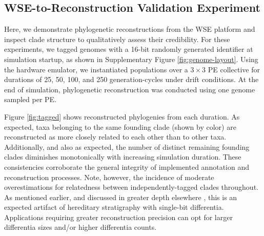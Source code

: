 \subsection{WSE-to-Reconstruction Validation Experiment}


Here, we demonstrate phylogenetic reconstructions from the WSE platform and inspect clade structure to qualitatively assess their credibility.
For these experiments, we tagged genomes with a 16-bit randomly generated identifier at simulation startup, as shown in Supplementary Figure \ref{fig:genome-layout}.
Using the hardware emulator, we instantiated populations over a $3\times3$ PE collective for durations of 25, 50, 100, and 250 generation-cycles under drift conditions.
At the end of simulation, phylogenetic reconstruction was conducted using one genome sampled per PE.



Figure \ref{fig:tagged} shows reconstructed phylogenies from each duration.
As expected, taxa belonging to the same founding clade (shown by color) are reconstructed as more closely related to each other than to other taxa.
Additionally, and also as expected, the number of distinct remaining founding clades diminishes monotonically with increasing simulation duration.
These consistencies corroborate the general integrity of implemented annotation and reconstruction processes.
Note, however, the incidence of moderate overestimations for relatedness between independently-tagged clades throughout.
As mentioned earlier, and discussed in greater depth elsewhere \citep{TODOOTHERPAPER}, this is an expected artifact of hereditary stratigraphy with single-bit differentia.
Applications requiring greater reconstruction precision can opt for larger differentia sizes and/or higher differentia counts.


